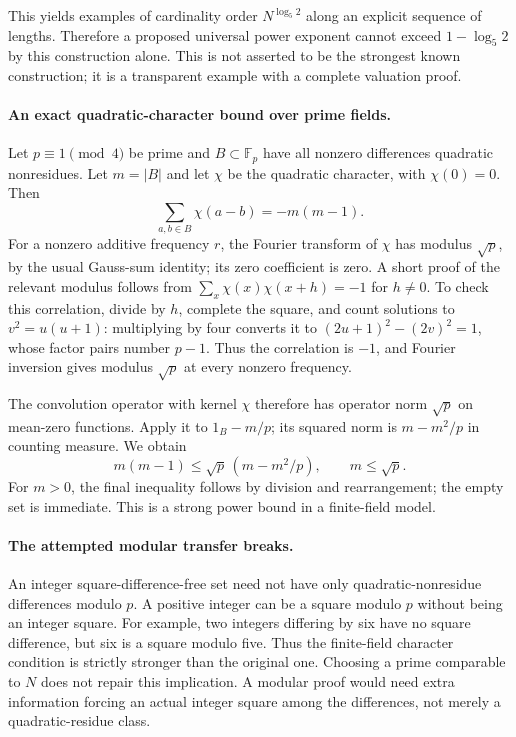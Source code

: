 \documentclass[11pt,a4paper]{article}
\newcommand{\F}{\mathbb{F}}
\begin{document}
This yields examples of cardinality order $N^{\log_5 2}$ along an explicit sequence of lengths. Therefore a proposed universal power exponent cannot exceed $1-\log_5 2$ by this construction alone. This is not asserted to be the strongest known construction; it is a transparent example with a complete valuation proof.

\paragraph{An exact quadratic-character bound over prime fields.}
Let $p\equiv1\pmod4$ be prime and $B\subset\F_p$ have all nonzero differences quadratic nonresidues. Let $m=|B|$ and let $\chi$ be the quadratic character, with $\chi(0)=0$. Then
\[
 \sum_{a,b\in B}\chi(a-b)=-m(m-1).
\]
For a nonzero additive frequency $r$, the Fourier transform of $\chi$ has modulus $\sqrt p$, by the usual Gauss-sum identity; its zero coefficient is zero. A short proof of the relevant modulus follows from $\sum_x\chi(x)\chi(x+h)=-1$ for $h\ne0$. To check this correlation, divide by $h$, complete the square, and count solutions to $v^2=u(u+1)$: multiplying by four converts it to $(2u+1)^2-(2v)^2=1$, whose factor pairs number $p-1$. Thus the correlation is $-1$, and Fourier inversion gives modulus $\sqrt p$ at every nonzero frequency.

The convolution operator with kernel $\chi$ therefore has operator norm $\sqrt p$ on mean-zero functions. Apply it to $1_B-m/p$; its squared norm is $m-m^2/p$ in counting measure. We obtain
\[
 m(m-1)\leq\sqrt p\,(m-m^2/p),
 \qquad m\leq\sqrt p.
\]
For $m>0$, the final inequality follows by division and rearrangement; the empty set is immediate. This is a strong power bound in a finite-field model.

\paragraph{The attempted modular transfer breaks.}
An integer square-difference-free set need not have only quadratic-nonresidue differences modulo $p$. A positive integer can be a square modulo $p$ without being an integer square. For example, two integers differing by six have no square difference, but six is a square modulo five. Thus the finite-field character condition is strictly stronger than the original one. Choosing a prime comparable to $N$ does not repair this implication. A modular proof would need extra information forcing an actual integer square among the differences, not merely a quadratic-residue class.
\end{document}
